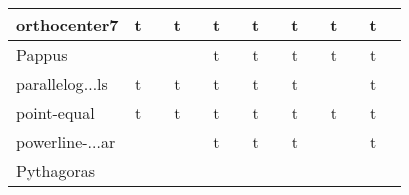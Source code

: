{\begin{longtable}{|l|*{7}{cr|}}
\\ \hline
\cellcolor{blue!10}orthocenter7 
& \cellcolor{green!60}t & \cellcolor{green!60}{\bf 5} 
& \cellcolor{green!40}t & \cellcolor{green!40}{ 63} 
& \cellcolor{green!40}t & \cellcolor{green!40}{ 68} 
& \cellcolor{green!30}t & \cellcolor{green!30}{\sl 257} 
& \cellcolor{green!40}t & \cellcolor{green!40}{ 120} 
& \cellcolor{green!40}t & \cellcolor{green!40}{ 133} 
& \cellcolor{green!60}t & \cellcolor{green!60}{ 11} 
\\ \hline
\cellcolor{blue!10}Pappus 
& \cellcolor{yellow!25} & \cellcolor{yellow!25}{ 6} 
& \cellcolor{yellow!25} & \cellcolor{yellow!25}{ t/o} 
& \cellcolor{green!50}t & \cellcolor{green!50}{\bf 43} 
& \cellcolor{green!20}t & \cellcolor{green!20}{ 567} 
& \cellcolor{green!20}t & \cellcolor{green!20}{\sl 686} 
& \cellcolor{green!40}t & \cellcolor{green!40}{ 84} 
& \cellcolor{green!20}t & \cellcolor{green!20}{ 617} 
\\ \hline
\cellcolor{blue!10}parallelog$\ldots$ls 
& \cellcolor{green!60}t & \cellcolor{green!60}{\bf 14} 
& \cellcolor{green!40}t & \cellcolor{green!40}{ 70} 
& \cellcolor{green!40}t & \cellcolor{green!40}{ 97} 
& \cellcolor{green!30}t & \cellcolor{green!30}{ 254} 
& \cellcolor{green!20}t & \cellcolor{green!20}{\sl 365} 
& \cellcolor{yellow!25} & \cellcolor{yellow!25}{ t/o} 
& \cellcolor{green!60}t & \cellcolor{green!60}{ 13} 
\\ \hline
\cellcolor{blue!10}point-equal 
& \cellcolor{green!60}t & \cellcolor{green!60}{\bf 4} 
& \cellcolor{green!60}t & \cellcolor{green!60}{ 12} 
& \cellcolor{green!40}t & \cellcolor{green!40}{ 68} 
& \cellcolor{green!30}t & \cellcolor{green!30}{\sl 234} 
& \cellcolor{green!40}t & \cellcolor{green!40}{ 64} 
& \cellcolor{green!40}t & \cellcolor{green!40}{ 72} 
& \cellcolor{green!60}t & \cellcolor{green!60}{ 4} 
\\ \hline
\cellcolor{blue!10}powerline-$\ldots$ar 
& \cellcolor{yellow!25} & \cellcolor{yellow!25}{ 4} 
& \cellcolor{yellow!25} & \cellcolor{yellow!25}{ 7} 
& \cellcolor{green!50}t & \cellcolor{green!50}{\bf 41} 
& \cellcolor{green!30}t & \cellcolor{green!30}{\sl 254} 
& \cellcolor{green!40}t & \cellcolor{green!40}{ 144} 
& \cellcolor{yellow!25} & \cellcolor{yellow!25}{ 83} 
& \cellcolor{green!30}t & \cellcolor{green!30}{ 249} 
\\ \hline
\cellcolor{blue!10}Pythagoras 
& \cellcolor{yellow!25} & \cellcolor{yellow!25}{ 4} 
& \cellcolor{yellow!25} & \cellcolor{yellow!25}{ 3} 
& \cellcolor{yellow!25} & \cellcolor{yellow!25}{ 15} 
& \cellcolor{yellow!25} & \cellcolor{yellow!25}{ 228} 

\end{longtable}}
